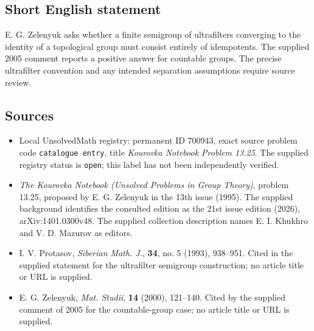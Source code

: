 \documentclass[11pt]{article}
\begin{document}
\subsection{Short English statement}
E. G. Zelenyuk asks whether a finite semigroup of ultrafilters converging to the identity of a topological group must consist entirely of idempotents. The supplied 2005 comment reports a positive answer for countable groups. The precise ultrafilter convention and any intended separation assumptions require source review.
\subsection{Sources}
\begin{itemize}
\item Local UnsolvedMath registry: permanent ID \(700943\), exact source problem code \texttt{catalogue entry}, title \emph{Kourovka Notebook Problem 13.25}. The supplied registry status is \texttt{open}; this label has not been independently verified.
\item \emph{The Kourovka Notebook (Unsolved Problems in Group Theory)}, problem 13.25, proposed by E. G. Zelenyuk in the 13th issue (1995). The supplied background identifies the consulted edition as the 21st issue edition (2026), arXiv:1401.0300v48. The supplied collection description names E. I. Khukhro and V. D. Mazurov as editors.
\item I. V. Protasov, \emph{Siberian Math. J.}, \textbf{34}, no. 5 (1993), 938--951. Cited in the supplied statement for the ultrafilter semigroup construction; no article title or URL is supplied.
\item E. G. Zelenyuk, \emph{Mat. Studii}, \textbf{14} (2000), 121--140. Cited by the supplied comment of 2005 for the countable-group case; no article title or URL is supplied.
\end{itemize}
\end{document}
